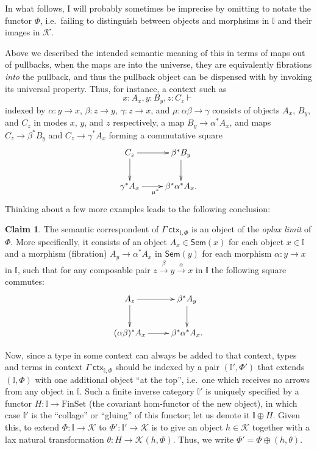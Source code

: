 \documentclass{amsart}
\def\K{\ensuremath{\mathcal{K}}}
\def\I{\ensuremath{\mathbb{I}}}
\def\ctx{\:\mathsf{ctx}}
\def\finset{\mathrm{FinSet}}
\def\sem{\mathsf{Sem}}
\theoremstyle{definition}
\newtheorem{claim}{Claim}
\begin{document}
In what follows, I will probably sometimes be imprecise by omitting to notate the functor $\Phi$, i.e.\ failing to distinguish between objects and morphsims in $\I$ and their images in $\K$.

Above we described the intended semantic meaning of this in terms of maps out of pullbacks, when the maps are into the universe, they are equivalently fibrations \emph{into} the pullback, and thus the pullback object can be dispensed with by invoking its universal property.
Thus, for instance, a context such as
\[ x:A_x , y:B_y , z: C_z \vdash\]
indexed by $\alpha:y\to x$, $\beta:z\to y$, $\gamma:z\to x$, and $\mu:\alpha\beta\to\gamma$ consists of objects $A_x$, $B_y$, and $C_z$ in modes $x$, $y$, and $z$ respectively, a map $B_y \to \alpha^* A_x$, and maps $C_z \to \beta^*B_y$ and $C_z \to \gamma^*A_x$ forming a commutative square
\begin{equation*}
  \vcenter{\xymatrix{
      C_z \ar[r]\ar[d] &
      \beta^* B_y\ar[d]\\
      \gamma^* A_x \ar[r]_{\mu^*} &
      \beta^* \alpha^* A_x.
      }}
\end{equation*}
Thinking about a few more examples leads to the following conclusion:

\begin{claim}
  The semantic correspondent of $\Gamma \ctx_{\I,\Phi}$ is an object of the \emph{oplax limit} of $\Phi$.
  More specifically, it consists of an object $A_x \in \sem(x)$ for each object $x\in \I$ and a morphism (fibration) $A_y \to \alpha^* A_x$ in $\sem(y)$ for each morphism $\alpha:y\to x$ in $\I$, such that for any composable pair $z \xrightarrow{\beta} y\xrightarrow{\alpha} x$ in $\I$ the following square commutes:
  \begin{equation*}
    \vcenter{\xymatrix{
        A_z \ar[r]\ar[d] &
        \beta^* A_y\ar[d]\\
        (\alpha\beta)^* A_x \ar[r] &
        \beta^* \alpha^* A_x.
      }}
  \end{equation*}
\end{claim}

Now, since a type in some context can always be added to that context, types and terms in context $\Gamma \ctx_{\I,\Phi}$ should be indexed by a pair $(\I',\Phi')$ that extends $(\I,\Phi)$ with one additional object ``at the top'', i.e.\ one which receives no arrows from any object in \I.
Such a finite inverse category $\I'$ is uniquely specified by a functor $H:\I\to\finset$ (the covariant hom-functor of the new object), in which case $\I'$ is the ``collage'' or ``gluing'' of this functor; let us denote it $\I\oplus H$.
Given this, to extend $\Phi:\I\to\K$ to $\Phi':\I'\to\K$ is to give an object $h\in\K$ together with a lax natural transformation $\theta : H \to \K(h,\Phi)$.
Thus, we write $\Phi' = \Phi \oplus (h,\theta)$.
\end{document}
